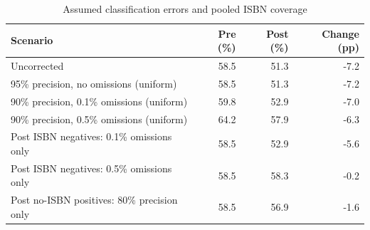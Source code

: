 \begin{table}[htbp]\centering\small
\caption{Assumed classification errors and pooled ISBN coverage}\label{tab:sensitivity}
\begin{tabular}{p{.56\linewidth}rrr}\toprule
Scenario & Pre (\%) & Post (\%) & Change (pp)\\\midrule
Uncorrected & 58.5 & 51.3 & -7.2\\
95\% precision, no omissions (uniform) & 58.5 & 51.3 & -7.2\\
90\% precision, 0.1\% omissions (uniform) & 59.8 & 52.9 & -7.0\\
90\% precision, 0.5\% omissions (uniform) & 64.2 & 57.9 & -6.3\\
Post ISBN negatives: 0.1\% omissions only & 58.5 & 52.9 & -5.6\\
Post ISBN negatives: 0.5\% omissions only & 58.5 & 58.3 & -0.2\\
Post no-ISBN positives: 80\% precision only & 58.5 & 56.9 & -1.6\\
\bottomrule\end{tabular}
\end{table}

